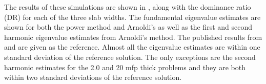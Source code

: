 \begin{comment}
\begin{table}[h] \centering
    \begin{tabular}{ccccccc}
        \toprule
        Width & Spatial & Particles &\multirow{2}{*}{Method} &  \multirow{2}{*}{Iterations} & Inactive & Active \\
        (mfp) & Bins & per Iteration &&  & Cycles & Cycles \\
        \midrule
        \multirow{2}{*}{0.2} & \multirow{2}{*}{50} & \multirow{2}{*}{$1 \times 10^5$} & Power & -- & 250 & 1000 \\
         & & & Arnoldi & 10 & 25 & 100 \\
        \midrule
        \multirow{2}{*}{2.0} & \multirow{2}{*}{75} & \multirow{2}{*}{$1 \times 10^5$} & Power & -- & 250 & 1000 \\
         & & & Arnoldi & 10 & 25 & 100 \\
        \midrule
        \multirow{2}{*}{20} & \multirow{2}{*}{75} & \multirow{2}{*}{$1 \times 10^5$} & Power & -- & 250 & 1000 \\
         & & & Arnoldi & 10 & 25 & 100 \\
        \bottomrule
    \end{tabular}
    \caption{Problem Parameters.  Power method cycles are power iterations while Arnoldi method cycles are explicit restarts.}
    \label{tab:BasicParameters}
\end{table}
\end{comment}

The results of these simulations are shown in , along with the dominance ratio (DR) for each of the three slab widths.  The fundamental eigenvalue estimates are shown for both the power method and Arnoldi's as well as the first and second harmonic eigenvalue estimates from Arnoldi's method.  The published results from \cite{Garis:1991One-s-0,Modak:1995Evalu-0} and \cite{Dahl:1979Eigen-0} are given as the reference.  Almost all the eigenvalue estimates are within one standard deviation of the reference solution.  The only exceptions are the second harmonic estimates for the 2.0 and 20 mfp thick problems and they are both within two standard deviations of the reference solution.

